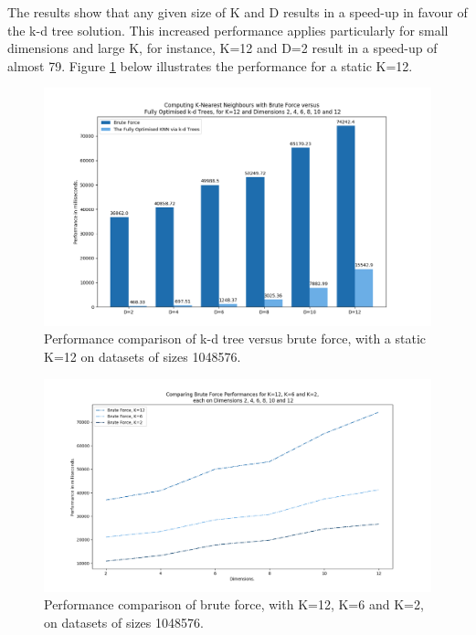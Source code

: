 
The results show that any given size of K and D results in a speed-up in favour of the k-d tree solution. This increased performance applies particularly for small dimensions and large K, for instance, K=12 and D=2 result in a speed-up of almost 79. Figure \ref{fig:b3} below illustrates the performance for a static K=12.


\begin{figure}[H]
\centering
\includegraphics[width=1.1\textwidth]{pics/plot-figs/new-brute-k12.png}
\caption{Performance comparison of k-d tree versus brute force, with a static K=12 on datasets of sizes 1048576.}
\label{fig:b3}
\end{figure}



\begin{figure}[H]
\centering
\includegraphics[width=1.1\textwidth]{pics/plot-figs/brute-k2k6k12.png}
\caption{Performance comparison of brute force, with K=12, K=6 and K=2, on datasets of sizes 1048576.}
\label{fig:b6}
\end{figure}


